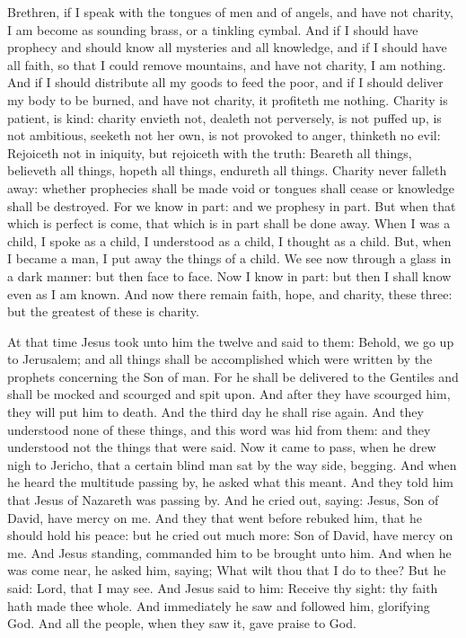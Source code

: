 Brethren, if I speak with the tongues of men and of angels, and have not charity, I am
become as sounding brass, or a tinkling cymbal.  And if I should have prophecy
and should know all mysteries and all knowledge, and if I should have all
faith, so that I could remove mountains, and have not charity, I am nothing.
And if I should distribute all my goods to feed the poor, and if I should
deliver my body to be burned, and have not charity, it profiteth me nothing.
Charity is patient, is kind: charity envieth not, dealeth not perversely, is
not puffed up, is not ambitious, seeketh not her own, is not provoked to anger,
thinketh no evil: Rejoiceth not in iniquity, but rejoiceth with the truth:
Beareth all things, believeth all things, hopeth all things, endureth all
things.  Charity never falleth away: whether prophecies shall be made void or
tongues shall cease or knowledge shall be destroyed.  For we know in part: and
we prophesy in part.  But when that which is perfect is come, that which is in
part shall be done away.  When I was a child, I spoke as a child, I understood
as a child, I thought as a child. But, when I became a man, I put away the
things of a child.  We see now through a glass in a dark manner: but then face
to face. Now I know in part: but then I shall know even as I am known.  And now
there remain faith, hope, and charity, these three: but the greatest of these
is charity.




At that time Jesus took unto him the twelve and said to them: Behold, we go up to
Jerusalem; and all things shall be accomplished which were written by the
prophets concerning the Son of man.  For he shall be delivered to the Gentiles
and shall be mocked and scourged and spit upon.  And after they have scourged
him, they will put him to death. And the third day he shall rise again.  And
they understood none of these things, and this word was hid from them: and they
understood not the things that were said.  Now it came to pass, when he drew
nigh to Jericho, that a certain blind man sat by the way side, begging.  And
when he heard the multitude passing by, he asked what this meant.  And they
told him that Jesus of Nazareth was passing by.  And he cried out, saying:
Jesus, Son of David, have mercy on me.  And they that went before rebuked him,
that he should hold his peace: but he cried out much more: Son of David, have
mercy on me.  And Jesus standing, commanded him to be brought unto him.  And
when he was come near, he asked him, saying; What wilt thou that I do to thee?
But he said: Lord, that I may see.  And Jesus said to him: Receive thy sight:
thy faith hath made thee whole.  And immediately he saw and followed him,
glorifying God.  And all the people, when they saw it, gave praise to God.

